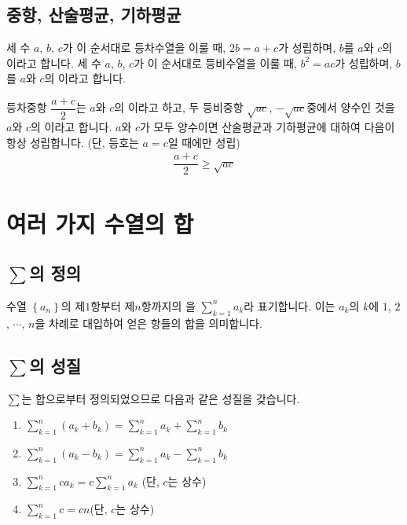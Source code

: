 \subsection{중항, 산술평균, 기하평균}
세 수 $a$, $b$, $c$가 이 순서대로 등차수열을 이룰 때, $2b=a+c$가 성립하며, $b$를 $a$와 $c$의 이라고 합니다. 세 수 $a$, $b$, $c$가 이 순서대로 등비수열을 이룰 때, $b^2 = ac$가 성립하며, $b$를 $a$와 $c$의 이라고 합니다.

등차중항 $\dfrac{a+c}{2}$는 $a$와 $c$의 이라고 하고, 두 등비중항 $\sqrt{ac}$, $-\sqrt{ac}$중에서 양수인 것을 $a$와 $c$의 이라고 합니다. $a$와 $c$가 모두 양수이면 산술평균과 기하평균에 대하여 다음이 항상 성립합니다. (단, 등호는 $a=c$일 때에만 성립) \begin{align*} \dfrac{a+c}{2} \ge \sqrt{ac}\end{align*}

\section{여러 가지 수열의 합}
\subsection{$\sum$의 정의}
수열 $\left\{ a_n \right\} $의 제$1$항부터 제$n$항까지의 을 $\sum_{k=1}^{n}a_k$라 표기합니다. 이는 $a_k$의 $k$에 $1$, $2$, $\cdots$, $n$을 차례로 대입하여 얻은 항들의 합을 의미합니다.

\subsection{$\sum$의 성질}
$\sum$는 합으로부터 정의되었으므로 다음과 같은 성질을 갖습니다.
\begin{thmbox}
    \begin{enumerate}[label=\onum*]
        \item $\sum_{k=1}^{n}\left( a_k + b_k\right) = \sum_{k=1}^{n}a_k + \sum_{k=1}^{n}b_k$
        \item $\sum_{k=1}^{n}\left( a_k - b_k\right) = \sum_{k=1}^{n}a_k - \sum_{k=1}^{n}b_k$
        \item $\sum_{k=1}^{n}ca_k = c\sum_
        {k=1}^{n}a_k$ (단, $c$는 상수)
        \item $\sum_{k=1}^{n}c = cn $(단, $c$는 상수)
    \end{enumerate}    
\end{thmbox}
\clearpage
